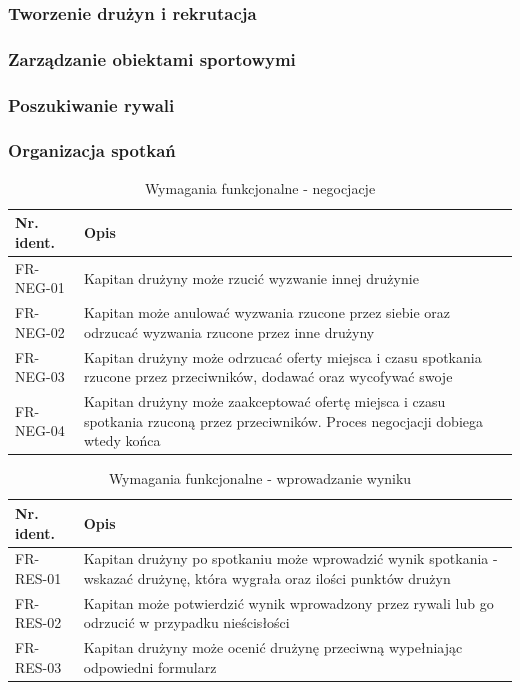 \subsubsection{Tworzenie drużyn i rekrutacja}

\subsubsection{Zarządzanie obiektami sportowymi}

\subsubsection{Poszukiwanie rywali}

\subsubsection{Organizacja spotkań}

\begin{table}[H]
\centering\small
\caption{Wymagania funkcjonalne - negocjacje}
\label{tab:szablon}
\begin{tabularx}{\linewidth}{|p{.2\linewidth}|X|}\hline
Nr. ident. & Opis \\ \hline\hline

FR-NEG-01 & Kapitan drużyny może rzucić wyzwanie innej drużynie  \\ \hline
FR-NEG-02 & Kapitan może anulować wyzwania rzucone przez siebie oraz odrzucać wyzwania rzucone przez inne drużyny  \\ \hline
FR-NEG-03 & Kapitan drużyny może odrzucać oferty miejsca i czasu spotkania rzucone przez przeciwników, dodawać oraz wycofywać swoje  \\ \hline
FR-NEG-04 & Kapitan drużyny może zaakceptować ofertę miejsca i czasu spotkania rzuconą przez przeciwników. Proces negocjacji dobiega wtedy końca  \\ \hline

\end{tabularx}
\end{table}

\begin{table}[H]
\centering\small
\caption{Wymagania funkcjonalne - wprowadzanie wyniku}
\label{tab:szablon}
\begin{tabularx}{\linewidth}{|p{.2\linewidth}|X|}\hline
Nr. ident. & Opis \\ \hline\hline

FR-RES-01 & Kapitan drużyny po spotkaniu może wprowadzić wynik spotkania - wskazać drużynę, która wygrała oraz ilości punktów drużyn  \\ \hline
FR-RES-02 & Kapitan może potwierdzić wynik wprowadzony przez rywali lub go odrzucić w przypadku nieścisłości  \\ \hline
FR-RES-03 & Kapitan drużyny może ocenić drużynę przeciwną wypełniając odpowiedni formularz \\ \hline

\end{tabularx}
\end{table}

